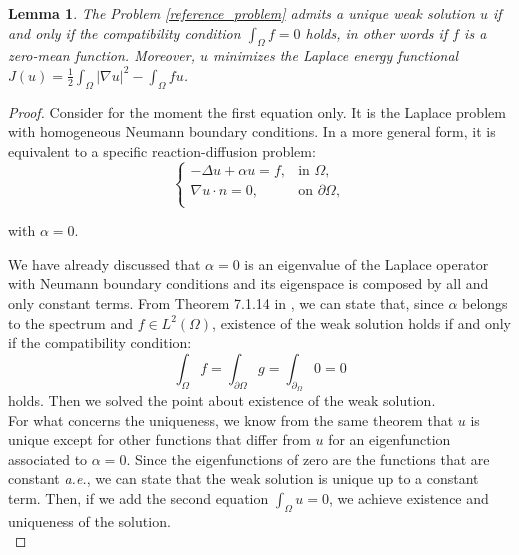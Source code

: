 \documentclass[a4paper,11pt]{article}
\newtheorem{lemma}{Lemma}
\begin{document}
\begin{lemma} \label{first_lemma}
	The Problem \ref{reference_problem} admits a unique weak solution $u$ if and only if the compatibility condition $\int_{\Omega} f = 0$ holds, in other words if $f$ is a zero-mean function. Moreover, $u$ minimizes the Laplace energy functional $J(u) = \frac{1}{2}\int_{\Omega} |\nabla u |^2 - \int_{\Omega}fu$.
\end{lemma} \vspace{1mm}
\begin{proof}
	Consider for the moment the first equation only. It is the Laplace problem with homogeneous Neumann boundary conditions. In a more general form, it is equivalent to a specific reaction-diffusion problem:
	\begin{equation*}
	\begin{cases}
	-\Delta{u} + \alpha u =f, & \text{in } \Omega,\\
	\nabla u \cdot n = 0, & \text{on } \partial \Omega, \\
	\end{cases}
	\end{equation*}
	\begin{center}
		with $\alpha = 0$.
	\end{center}
     We have already discussed that $\alpha=0$ is an eigenvalue of the Laplace operator with Neumann boundary conditions and its eigenspace is composed by all and only constant terms. From Theorem 7.1.14 in \cite{gazzola}, we can state that, since $\alpha$ belongs to the spectrum and $f\in L^2(\Omega)$, existence of the weak solution holds if and only if the compatibility condition:
     \begin{equation*}
     \int_{\Omega}f = \int_{\partial \Omega} g = \int_{\partial_\Omega} 0 = 0 
     \end{equation*}
     holds. Then we solved the point about existence of the weak solution. \\
     
     \noindent For what concerns the uniqueness, we know from the same theorem that $u$ is unique except for other functions that differ from $u$ for an eigenfunction associated to $\alpha=0$. Since the eigenfunctions of zero are the functions that are constant \emph{a.e.}, we can state that the weak solution is unique up to a constant term. Then, if we add the second equation $\int_{\Omega}u = 0$, we achieve existence and uniqueness of the solution. \\
     

\end{proof}
\end{document}
